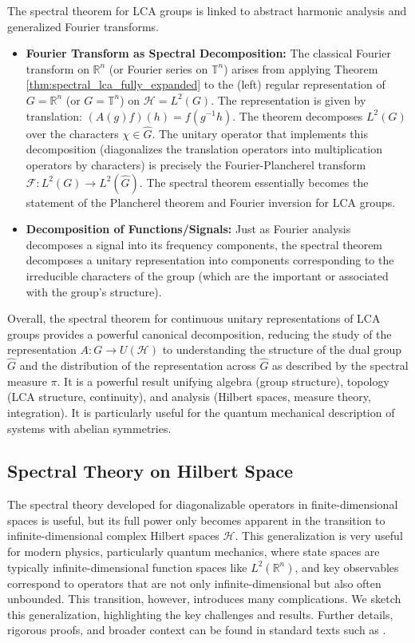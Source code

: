 The spectral theorem for LCA groups is linked to abstract harmonic analysis and generalized Fourier transforms.
\begin{itemize}
    \item \textbf{Fourier Transform as Spectral Decomposition:} The classical Fourier transform on $\mathbb{R}^n$ (or Fourier series on $\mathbb{T}^n$) arises from applying Theorem \ref{thm:spectral_lca_fully_expanded} to the (left) regular representation of $G = \mathbb{R}^n$ (or $G = \mathbb{T}^n$) on $\mathcal{H} = L^2(G)$. The representation is given by translation: $(A(g)f)(h) = f(g^{-1}h)$. The theorem decomposes $L^2(G)$ over the characters $\chi \in \hat{G}$. The unitary operator that implements this decomposition (diagonalizes the translation operators into multiplication operators by characters) is precisely the Fourier-Plancherel transform $\mathcal{F}: L^2(G) \to L^2(\hat{G})$. The spectral theorem essentially becomes the statement of the Plancherel theorem and Fourier inversion for LCA groups.
    \item \textbf{Decomposition of Functions/Signals:} Just as Fourier analysis decomposes a signal into its frequency components, the spectral theorem decomposes a unitary representation into components corresponding to the irreducible characters of the group (which are the important  or  associated with the group's structure).
\end{itemize}

Overall, the spectral theorem for continuous unitary representations of LCA groups provides a powerful canonical decomposition, reducing the study of the representation $A: G \to U(\mathcal{H})$ to understanding the structure of the dual group $\hat{G}$ and the distribution of the representation across $\hat{G}$ as described by the spectral measure $\pi$. It is a powerful result unifying algebra (group structure), topology (LCA structure, continuity), and analysis (Hilbert spaces, measure theory, integration). It is particularly useful for the quantum mechanical description of systems with abelian symmetries.

\subsection{Spectral Theory on Hilbert Space}
\label{sec:hilbert}

The spectral theory developed for diagonalizable operators in finite-dimensional spaces is useful, but its full power only becomes apparent in the transition to infinite-dimensional complex Hilbert spaces $\mathcal{H}$. This generalization is very useful for modern physics, particularly quantum mechanics, where state spaces are typically infinite-dimensional function spaces like $L^2(\mathbb{R}^n)$, and key observables correspond to operators that are not only infinite-dimensional but also often unbounded. This transition, however, introduces many complications. We sketch this generalization, highlighting the key challenges and results. Further details, rigorous proofs, and broader context can be found in standard texts such as \cite{ReedSimon1980}.

